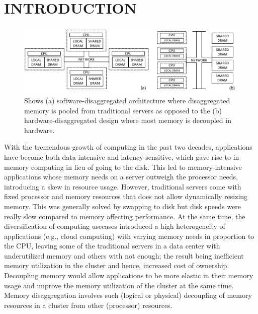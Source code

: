 \section{INTRODUCTION}
\label{sec:intro}

\begin{figure}[h!]
    \centering
    \includegraphics[width=.9\linewidth]{fig/architecture.pdf}
    \caption{Shows (a) software-disaggregated 
    architecture where disaggregated memory is pooled from 
    traditional servers as opposed to the (b) hardware-disaggregated
    design where most memory is decoupled in hardware.}
    \label{fig:architecture}
\end{figure}

With the tremendous growth of computing in the past two 
decades, applications have become both data-intensive 
and latency-sensitive, which gave rise to in-memory 
computing in lieu of going to the disk. 
This led to memory-intensive 
applications whose memory needs on a server outweigh the 
processor needs, introducing a skew in resource usage.
However, traditional servers come with fixed processor 
and memory resources that does not allow dynamically
resizing memory. This was generally solved by swapping 
to disk but disk speeds were really slow compared to memory 
affecting performance. 
At the same time, the diversification of computing usecases 
introduced a high heterogeneity of applications (e.g., cloud 
computing) with varying memory needs in proportion to 
the CPU, leaving some of the traditional servers in a data center  
with underutilized memory and others with not enough; the result
being inefficient memory utilization in the cluster and hence,
increased cost of ownership. Decoupling memory would allow 
applications to be more elastic in their memory usage and 
improve the memory utilization of the cluster at the same time.
Memory disaggregation involves such (logical or physical) 
decoupling of memory resources in a cluster from other 
(processor) resources. 

